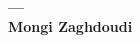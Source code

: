 \begin{titlepage}
    \centering
    \vspace*{3cm}
    {\bfseries\Large
        \thetitle\\
        \thetitleobject\\
        --- \\
        Mongi Zaghdoudi\\  																			%
        \vskip2cm
    }
    
\end{titlepage}


